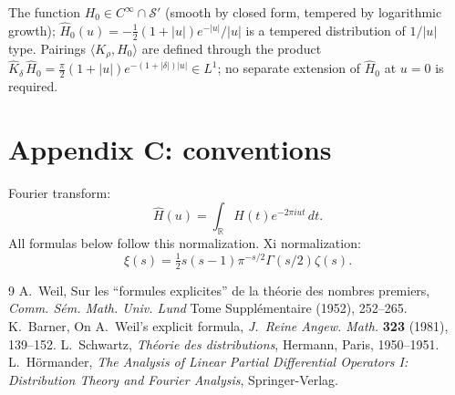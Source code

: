 \documentclass[11pt]{article}
\begin{document}
The function $H_0\in C^\infty\cap\mathcal S'$ (smooth by closed form,
tempered by logarithmic growth); $\widehat H_0(u)=
-\tfrac12(1+|u|)e^{-|u|}/|u|$ is a tempered distribution of $1/|u|$
type.  Pairings $\langle K_\rho,H_0\rangle$ are defined through the
product $\widehat K_\delta\,\widehat H_0=\tfrac{\pi}{2}(1+|u|)e^{-(1+|\delta|)|u|}
\in L^1$; no separate extension of $\widehat H_0$ at $u=0$ is required.

\section{Appendix C: conventions}
Fourier transform:
\begin{equation}
\widehat H(u)=\int_{\mathbb R} H(t)e^{-2\pi iut}\,dt.
\end{equation}
All formulas below follow this normalization.
Xi normalization:
\begin{equation}
\xi(s)=\tfrac12 s(s-1)\pi^{-s/2}\Gamma(s/2)\zeta(s).
\end{equation}

\begin{thebibliography}{9}
A.~Weil, Sur les ``formules explicites'' de la théorie des nombres
premiers, \emph{Comm. S\'em. Math. Univ. Lund} Tome Suppl\'ementaire
(1952), 252--265.
K.~Barner, On A.~Weil's explicit formula,
\emph{J.~Reine Angew. Math.} \textbf{323} (1981), 139--152.
L.~Schwartz, \emph{Th\'eorie des distributions}, Hermann, Paris,
1950--1951.
L.~H\"ormander, \emph{The Analysis of Linear Partial Differential
Operators I: Distribution Theory and Fourier Analysis}, Springer-Verlag.
\end{thebibliography}
\end{document}

